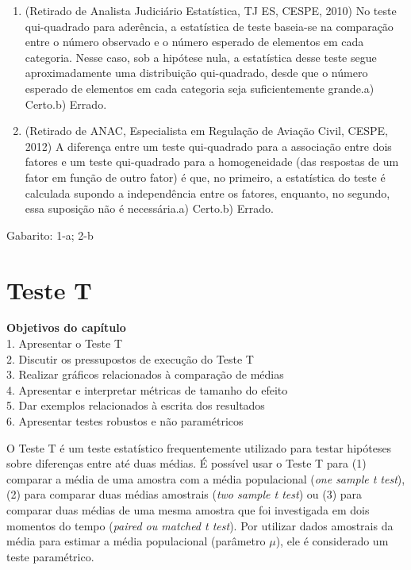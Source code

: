 \documentclass[
]{book}
\newenvironment{objectives}{
  \definecolor{shadecolor}{rgb}{0, 0, 0}  %
  \color{white}
  \begin{shaded}}
 {\end{shaded}}
\newenvironment{question}{
  \definecolor{shadecolor}{rgb}{0, 0, 0}  %
  \color{white}
  \begin{shaded}}
 {\end{shaded}}
\begin{document}
\begin{question}

\begin{enumerate}
\def\labelenumi{\arabic{enumi}.}
\item
  (Retirado de Analista Judiciário Estatística, TJ ES, CESPE, 2010) No teste qui-quadrado para aderência, a estatística de teste baseia-se na comparação entre o número observado e o número esperado de elementos em cada categoria. Nesse caso, sob a hipótese nula, a estatística desse teste segue aproximadamente uma distribuição qui-quadrado, desde que o número esperado de elementos em cada categoria seja suficientemente grande.a) Certo.b) Errado.
\item
  (Retirado de ANAC, Especialista em Regulação de Aviação Civil, CESPE, 2012) A diferença entre um teste qui-quadrado para a associação entre dois fatores e um teste qui-quadrado para a homogeneidade (das respostas de um fator em função de outro fator) é que, no primeiro, a estatística do teste é calculada supondo a independência entre os fatores, enquanto, no segundo, essa suposição não é necessária.a) Certo.b) Errado.
\end{enumerate}

\end{question}

Gabarito: 1-a; 2-b

\hypertarget{teste-t}{%
\chapter{Teste T}\label{teste-t}}

\begin{objectives}

\textbf{Objetivos do capítulo}\\
1. Apresentar o Teste T\\
2. Discutir os pressupostos de execução do Teste T\\
3. Realizar gráficos relacionados à comparação de médias\\
4. Apresentar e interpretar métricas de tamanho do efeito\\
5. Dar exemplos relacionados à escrita dos resultados\\
6. Apresentar testes robustos e não paramétricos

\end{objectives}

O Teste T é um teste estatístico frequentemente utilizado para testar hipóteses sobre diferenças entre até duas médias. É possível usar o Teste T para (1) comparar a média de uma amostra com a média populacional (\emph{one sample t test}), (2) para comparar duas médias amostrais (\emph{two sample t test}) ou (3) para comparar duas médias de uma mesma amostra que foi investigada em dois momentos do tempo (\emph{paired ou matched t test}). Por utilizar dados amostrais da média para estimar a média populacional (parâmetro \(\mu\)), ele é considerado um teste paramétrico.
\end{document}
